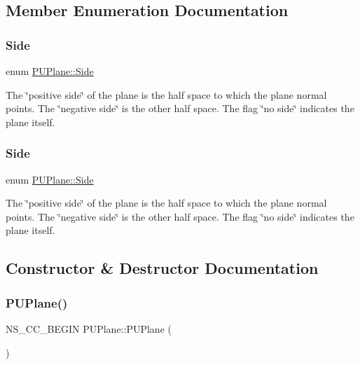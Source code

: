 \subsection{Member Enumeration Documentation}
\mbox{\label{classPUPlane_a9fa81224a5c3d8ed875f2bacfa01790c}} 
\subsubsection{\texorpdfstring{Side}{Side}\hspace{0.1cm}{\footnotesize\ttfamily [1/2]}}
{\footnotesize\ttfamily enum \hyperlink{classPUPlane_a9fa81224a5c3d8ed875f2bacfa01790c}{P\+U\+Plane\+::\+Side}}

The \char`\"{}positive side\char`\"{} of the plane is the half space to which the plane normal points. The \char`\"{}negative side\char`\"{} is the other half space. The flag \char`\"{}no side\char`\"{} indicates the plane itself. \mbox{\label{classPUPlane_a9fa81224a5c3d8ed875f2bacfa01790c}} 
\subsubsection{\texorpdfstring{Side}{Side}\hspace{0.1cm}{\footnotesize\ttfamily [2/2]}}
{\footnotesize\ttfamily enum \hyperlink{classPUPlane_a9fa81224a5c3d8ed875f2bacfa01790c}{P\+U\+Plane\+::\+Side}}

The \char`\"{}positive side\char`\"{} of the plane is the half space to which the plane normal points. The \char`\"{}negative side\char`\"{} is the other half space. The flag \char`\"{}no side\char`\"{} indicates the plane itself. 

\subsection{Constructor \& Destructor Documentation}
\mbox{\label{classPUPlane_a13f5ef6354af2739872b4c3ebae4f1b9}} 
\subsubsection{\texorpdfstring{P\+U\+Plane()}{PUPlane()}\hspace{0.1cm}{\footnotesize\ttfamily [1/6]}}
{\footnotesize\ttfamily N\+S\+\_\+\+C\+C\+\_\+\+B\+E\+G\+IN P\+U\+Plane\+::\+P\+U\+Plane (\begin{DoxyParamCaption}{ }\end{DoxyParamCaption})}

